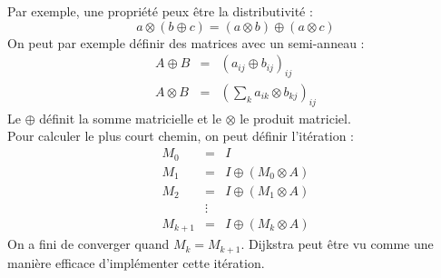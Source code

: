 Par exemple, une propriété peux être la distributivité :
$$a\otimes (b \oplus c) = (a \otimes b)\oplus(a \otimes c) $$
On peut par exemple définir des matrices avec un semi-anneau :
\begin{eqnarray}
  A \oplus B &=& (a_{ij} \oplus b_{ij})_{ij}\\
  A \otimes B &=& (\sum_k a_{ik} \otimes b_{kj})_{ij}
\end{eqnarray}
Le $\oplus$ définit la somme matricielle et le $\otimes$ le produit matriciel.\\
Pour calculer le plus court chemin, on peut définir l'itération :
\begin{eqnarray}
  M_0 &=& I\\
  M_1 &=& I \oplus (M_0 \otimes A)\\
  M_2 &=& I \oplus (M_1 \otimes A)\\
   &\vdots &\\
  M_{k+1} &=& I \oplus (M_k \otimes A)
\end{eqnarray}
On a fini de converger quand $M_k = M_{k+1}$. Dijkstra peut être vu comme une manière efficace d'implémenter cette itération.
